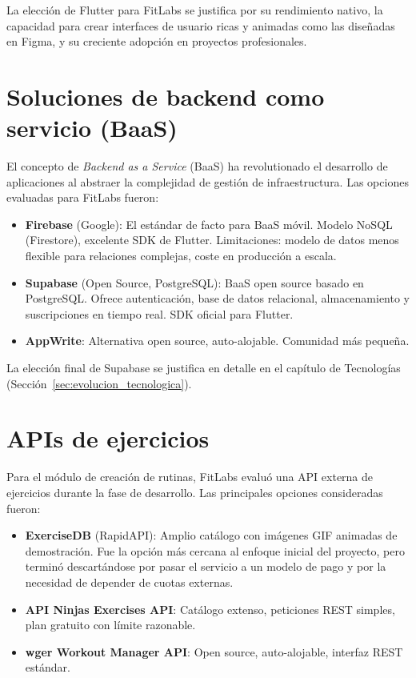 La elección de Flutter para FitLabs se justifica por su rendimiento nativo, la capacidad para crear interfaces de usuario ricas y animadas como las diseñadas en Figma, y su creciente adopción en proyectos profesionales.

\section{Soluciones de backend como servicio (BaaS)}

El concepto de \textit{Backend as a Service} (BaaS) ha revolutionado el desarrollo de aplicaciones al abstraer la complejidad de gestión de infraestructura. Las opciones evaluadas para FitLabs fueron:

\begin{itemize}
  \item \textbf{Firebase} (Google): El estándar de facto para BaaS móvil. Modelo NoSQL (Firestore), excelente SDK de Flutter. Limitaciones: modelo de datos menos flexible para relaciones complejas, coste en producción a escala.
  \item \textbf{Supabase} (Open Source, PostgreSQL): BaaS open source basado en PostgreSQL. Ofrece autenticación, base de datos relacional, almacenamiento y suscripciones en tiempo real. SDK oficial para Flutter.
  \item \textbf{AppWrite}: Alternativa open source, auto-alojable. Comunidad más pequeña.
\end{itemize}

La elección final de Supabase se justifica en detalle en el capítulo de Tecnologías (Sección~\ref{sec:evolucion_tecnologica}).

\section{APIs de ejercicios}

Para el módulo de creación de rutinas, FitLabs evaluó una API externa de ejercicios durante la fase de desarrollo. Las principales opciones consideradas fueron:

\begin{itemize}
  \item \textbf{ExerciseDB} (RapidAPI): Amplio catálogo con imágenes GIF animadas de demostración. Fue la opción más cercana al enfoque inicial del proyecto, pero terminó descartándose por pasar el servicio a un modelo de pago y por la necesidad de depender de cuotas externas.
  \item \textbf{API Ninjas Exercises API}: Catálogo extenso, peticiones REST simples, plan gratuito con límite razonable.
  \item \textbf{wger Workout Manager API}: Open source, auto-alojable, interfaz REST estándar.
\end{itemize}

